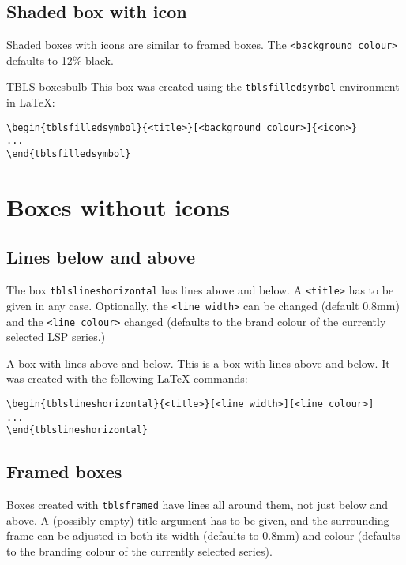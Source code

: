 \documentclass[output=paper]{langscibook}
\begin{document}
\subsection{Shaded box with icon}

Shaded boxes with icons are similar to framed boxes. The \texttt{<background colour>} defaults to 12\% black.

\begin{tblsfilledsymbol}{TBLS boxes}{bulb}
This box was created using the \texttt{tblsfilledsymbol} environment in \LaTeX{}:

\begin{lstlisting}
\begin{tblsfilledsymbol}{<title>}[<background colour>]{<icon>}
...
\end{tblsfilledsymbol}
\end{lstlisting}
\end{tblsfilledsymbol}


\section{Boxes without icons}
\subsection{Lines below and above}

The box \texttt{tblslineshorizontal} has lines above and below. A \texttt{<title>} has to be given in any case. Optionally, the \texttt{<line width>} can be changed (default 0.8mm) and the \texttt{<line colour>} changed (defaults to the brand colour of the currently selected LSP series.)

\begin{tblslineshorizontal}{A box with lines above and below.}
	This is a box with lines above and below. It was created with the following \LaTeX{} commands:
	
\begin{lstlisting}
\begin{tblslineshorizontal}{<title>}[<line width>][<line colour>]
...
\end{tblslineshorizontal}
\end{lstlisting}
\end{tblslineshorizontal}

\subsection{Framed boxes}
Boxes created with \texttt{tblsframed} have lines all around them, not just below and above. A (possibly empty) title argument has to be given, and the surrounding frame can be adjusted in both its width (defaults to 0.8mm) and colour (defaults to the branding colour of the currently selected series).
\end{document}
